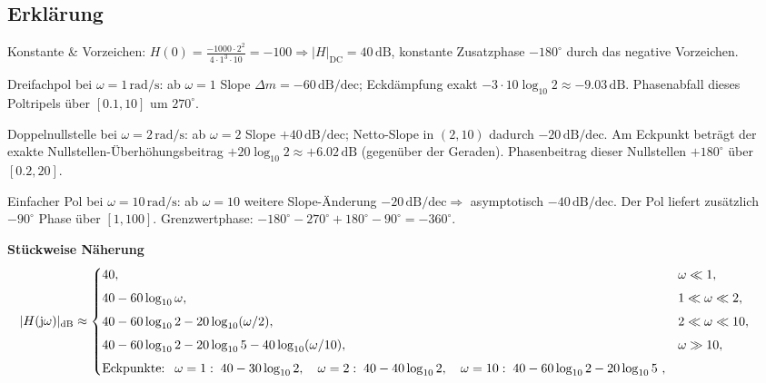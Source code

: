 \subsection{Erklärung}
\vspace{5mm}
\begin{description}[leftmargin=1.2em,labelsep=.6em,font=\bfseries]
\item[Schritt 1] Konstante \& Vorzeichen: $H(0)=\frac{-1000\cdot 2^2}{4\cdot1^3\cdot10}=-100\Rightarrow |H|_{\mathrm{DC}}=40\,\mathrm{dB}$, konstante Zusatzphase $-180^\circ$ durch das negative Vorzeichen.
\item[Schritt 2] Dreifachpol bei $\omega=1\,\mathrm{rad/s}$: ab $\omega=1$ Slope $\Delta m=-60\,\mathrm{dB/dec}$; Eckdämpfung exakt $-3\cdot10\log_{10}2\approx-9.03\,\mathrm{dB}$. Phasenabfall dieses Poltripels über $[0.1,10]$ um $270^\circ$.
\item[Schritt 3] Doppelnullstelle bei $\omega=2\,\mathrm{rad/s}$: ab $\omega=2$ Slope $+40\,\mathrm{dB/dec}$; Netto-Slope in $(2,10)$ dadurch $-20\,\mathrm{dB/dec}$. Am Eckpunkt beträgt der exakte Nullstellen-Überhöhungsbeitrag $+20\log_{10}2\approx+6.02\,\mathrm{dB}$ (gegenüber der Geraden). Phasenbeitrag dieser Nullstellen $+180^\circ$ über $[0.2,20]$.
\item[Schritt 4] Einfacher Pol bei $\omega=10\,\mathrm{rad/s}$: ab $\omega=10$ weitere Slope-Änderung $-20\,\mathrm{dB/dec}\Rightarrow$ asymptotisch $-40\,\mathrm{dB/dec}$. Der Pol liefert zusätzlich $-90^\circ$ Phase über $[1,100]$. Grenzwertphase: $-180^\circ-270^\circ+180^\circ-90^\circ=-360^\circ$.
\end{description}

\vspace{0.5cm}
\medskip
\noindent\textbf{Stückweise Näherung}
\[
|H(\operatorname{j}\!\omega)|_{\mathrm{dB}}\approx
\begin{cases}
40,& \omega\ll1,\\[4pt]
40-60\log_{10}\omega,& 1\ll\omega\ll2,\\[4pt]
40-60\log_{10}2-20\log_{10}(\omega/2),& 2\ll\omega\ll10,\\[4pt]
40-60\log_{10}2-20\log_{10}5-40\log_{10}(\omega/10),& \omega\gg10,\\[4pt]
\text{Eckpunkte: }~\omega=1:\;40-30\log_{10}2,\quad \omega=2:\;40-40\log_{10}2,\quad \omega=10:\;40-60\log_{10}2-20\log_{10}5~,
\end{cases}
\qquad
\]
\newpage